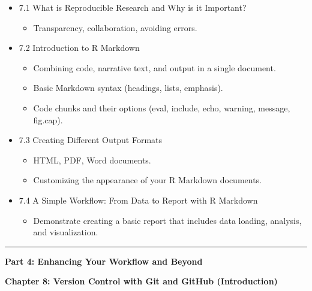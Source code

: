 \documentclass[
  letterpaper,
  DIV=11,
  numbers=noendperiod]{scrreprt}
\providecommand{\tightlist}{%
  \setlength{\itemsep}{0pt}\setlength{\parskip}{0pt}}\usepackage{longtable,booktabs,array}
\begin{document}
\begin{itemize}
\tightlist
\item
  7.1 What is Reproducible Research and Why is it Important?

  \begin{itemize}
  \tightlist
  \item
    Transparency, collaboration, avoiding errors.
  \end{itemize}
\item
  7.2 Introduction to R Markdown

  \begin{itemize}
  \tightlist
  \item
    Combining code, narrative text, and output in a single document.
  \item
    Basic Markdown syntax (headings, lists, emphasis).
  \item
    Code chunks and their options (eval, include, echo, warning,
    message, fig.cap).
  \end{itemize}
\item
  7.3 Creating Different Output Formats

  \begin{itemize}
  \tightlist
  \item
    HTML, PDF, Word documents.
  \item
    Customizing the appearance of your R Markdown documents.
  \end{itemize}
\item
  7.4 A Simple Workflow: From Data to Report with R Markdown

  \begin{itemize}
  \tightlist
  \item
    Demonstrate creating a basic report that includes data loading,
    analysis, and visualization.
  \end{itemize}
\end{itemize}

\begin{center}\rule{0.5\linewidth}{0.5pt}\end{center}

\textbf{Part 4: Enhancing Your Workflow and Beyond}

\textbf{Chapter 8: Version Control with Git and GitHub (Introduction)}
\end{document}
